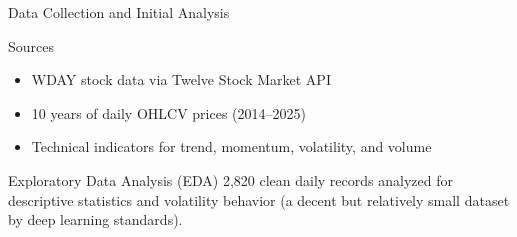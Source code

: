 \begin{frame}[label=datacollectioneda]{Data Collection and Initial Analysis}

\begin{block}{Sources}
    \begin{itemize}
        \item WDAY stock data via Twelve Stock Market API
        \item 10 years of daily OHLCV prices (2014–2025)
        \item Technical indicators for trend, momentum, volatility, and volume
    \end{itemize}
\end{block}

\begin{alertblock}{Exploratory Data Analysis (EDA)}
    2,820 clean daily records analyzed for descriptive statistics and volatility behavior (a decent but relatively small dataset by deep learning standards).
\end{alertblock}

\end{frame}

